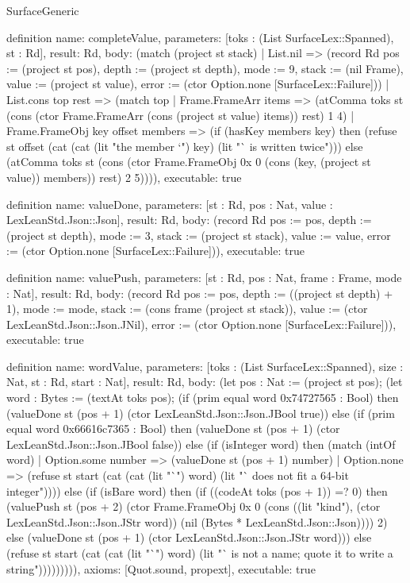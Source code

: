 \begin{lexlean}{SurfaceGeneric}
\begin{semanticmodule}
definition{
  name: completeValue,
  parameters: [toks : (List SurfaceLex::Spanned), st : Rd],
  result: Rd,
  body: (match (project st stack)
    | List.nil => (record Rd {pos := (project st pos), depth := (project st depth), mode := 9, stack := (nil Frame), value := (project st value), error := (ctor Option.none [SurfaceLex::Failure])})
    | List.cons top rest => (match top
      | Frame.FrameArr items => (atComma toks st (cons (ctor Frame.FrameArr (cons (project st value) items)) rest) 1 4)
      | Frame.FrameObj key offset members => (if (hasKey members key) then (refuse st offset (cat (cat (lit "the member `") key) (lit "` is written twice"))) else (atComma toks st (cons (ctor Frame.FrameObj 0x 0 (cons (key, (project st value)) members)) rest) 2 5)))),
  executable: true
}

definition{
  name: valueDone,
  parameters: [st : Rd, pos : Nat, value : LexLeanStd.Json::Json],
  result: Rd,
  body: (record Rd {pos := pos, depth := (project st depth), mode := 3, stack := (project st stack), value := value, error := (ctor Option.none [SurfaceLex::Failure])}),
  executable: true
}

definition{
  name: valuePush,
  parameters: [st : Rd, pos : Nat, frame : Frame, mode : Nat],
  result: Rd,
  body: (record Rd {pos := pos, depth := ((project st depth) + 1), mode := mode, stack := (cons frame (project st stack)), value := (ctor LexLeanStd.Json::Json.JNil), error := (ctor Option.none [SurfaceLex::Failure])}),
  executable: true
}

definition{
  name: wordValue,
  parameters: [toks : (List SurfaceLex::Spanned), size : Nat, st : Rd, start : Nat],
  result: Rd,
  body: (let pos : Nat := (project st pos); (let word : Bytes := (textAt toks pos); (if (prim equal word 0x74727565 : Bool) then (valueDone st (pos + 1) (ctor LexLeanStd.Json::Json.JBool true)) else (if (prim equal word 0x66616c7365 : Bool) then (valueDone st (pos + 1) (ctor LexLeanStd.Json::Json.JBool false)) else (if (isInteger word) then (match (intOf word)
    | Option.some number => (valueDone st (pos + 1) number)
    | Option.none => (refuse st start (cat (cat (lit "`") word) (lit "` does not fit a 64-bit integer")))) else (if (isBare word) then (if ((codeAt toks (pos + 1)) =? 0) then (valuePush st (pos + 2) (ctor Frame.FrameObj 0x 0 (cons ((lit "kind"), (ctor LexLeanStd.Json::Json.JStr word)) (nil (Bytes * LexLeanStd.Json::Json)))) 2) else (valueDone st (pos + 1) (ctor LexLeanStd.Json::Json.JStr word))) else (refuse st start (cat (cat (lit "`") word) (lit "` is not a name; quote it to write a string"))))))))),
  axioms: [Quot.sound, propext],
  executable: true
}


\end{semanticmodule}
\end{lexlean}
